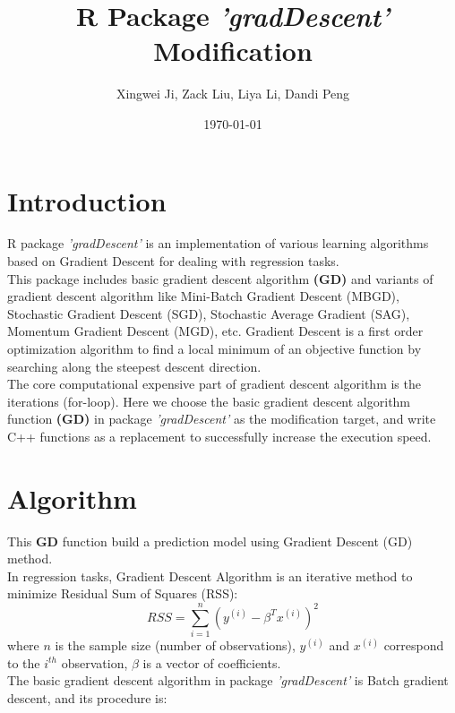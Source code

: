 \documentclass[12pt, letterpaper]{article} %
\title{R Package \textit{\textbf{'gradDescent'}} Modification} %
\author{
Xingwei Ji, Zack Liu, Liya Li, Dandi Peng%
  }
\date{\small \today} %
\begin{document}
%

\maketitle %


\setcounter{page}{1} %
\vspace*{-12mm}
\section{Introduction} %
\vspace*{-3mm}
R package \textit{'gradDescent'} is an implementation of various learning algorithms based on Gradient Descent for dealing with regression tasks.\\
\noindent
This package includes basic gradient descent algorithm \textbf{(GD)} and variants of gradient descent algorithm like Mini-Batch Gradient Descent (MBGD), Stochastic Gradient Descent (SGD), Stochastic Average Gradient (SAG), Momentum Gradient Descent (MGD), etc. Gradient Descent is a first order optimization algorithm to find a local minimum of an objective function by searching along the steepest descent direction.\\
\noindent
The core computational expensive part of gradient descent algorithm is the iterations (for-loop). Here we choose the basic gradient descent algorithm function \textbf{(GD)} in package \textit{'gradDescent'} as the modification target, and write C++ functions as a replacement to successfully increase the execution speed. \\
\vspace*{-15mm}
\section{Algorithm}
\vspace*{-3mm}
This \textbf{GD} function build a prediction model using Gradient Descent (GD) method. \\
\noindent
In regression tasks, Gradient Descent Algorithm is an iterative method to minimize Residual Sum of Squares (RSS):
$$RSS= \sum_{i=1}^{n}(y^{(i)}-\beta^Tx^{(i)})^2$$
where $n$ is the sample size (number of observations), $y^{(i)}$ and $x^{(i)}$ correspond to the $i^{th}$ observation, $\beta$ is a vector of coefficients.\\
\noindent
The basic gradient descent algorithm in package \textit{'gradDescent'} is Batch gradient descent, and its procedure is:
\end{document}

